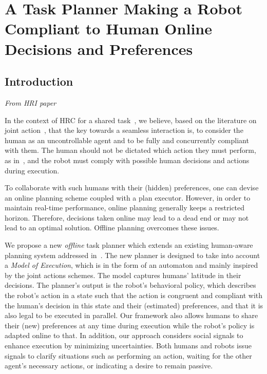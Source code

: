 \ifdefined{}
\else
\setcounter{chapter}{3} %
\dominitoc
\faketableofcontents
\fi

\chapter{A Task Planner Making a Robot Compliant to Human Online Decisions and Preferences}
\label{chap:4}
\minitoc


\section{Introduction}

\textit{From HRI paper}

In the context of HRC for a shared task~\cite{selvaggio2021autonomy}, we believe, based on the literature on joint action~\cite{sebanz-2006joint,sebanz-2009,clodic-2017,gordon-2023}, that the key towards a seamless interaction is, to consider the human as an uncontrollable agent and to be fully and concurrently compliant with them. 
The human should not be dictated which action they must perform, as in~\cite{roncone2017transparent,buisan:hal-03684211}, and the robot must comply with possible human decisions and actions during execution.

To collaborate with such humans with their (hidden) preferences, one can devise an online planning scheme coupled with a plan executor. 
However, in order to maintain real-time performance, online planning generally keeps a restricted horizon. 
Therefore, decisions taken online may lead to a dead end or may not lead to an optimal solution. 
Offline planning overcomes these issues. 

We propose a new \textit{offline} task planner which extends an existing human-aware planning system addressed in~\cite{buisan:hal-03684211}. 
The new planner is designed to take into account a \textit{Model of Execution}, which is in the form of an automaton and mainly inspired by the joint actions schemes. 
The model captures humans' latitude in their decisions. 
The planner's output is the robot's behavioral policy, which describes the robot's action in a state such that the action is congruent and compliant with the human's decision in this state and their (estimated) preferences, and that it is also legal to be executed in parallel. 
Our framework also allows humans to share their (new) preferences at any time during execution while the robot's policy is adapted online to that. 
In addition, our approach considers social signals to enhance execution by minimizing uncertainties. Both humans and robots issue signals to clarify situations such as performing an action, waiting for the other agent's necessary actions, or indicating a desire to remain passive.

